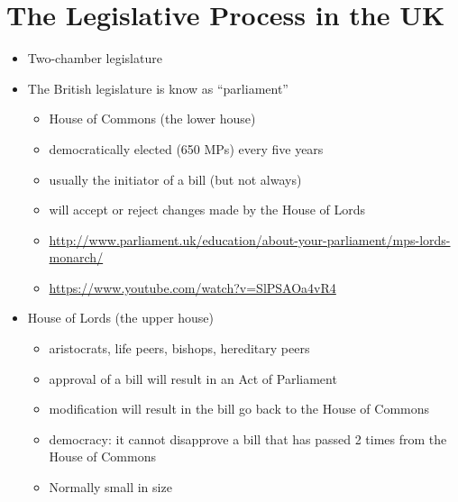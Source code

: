 \documentclass{article}
\begin{document}
\section{The Legislative Process in the UK}
\begin{itemize}
\item Two-chamber legislature
\item The British  legislature is know as ``parliament''
\begin{itemize}
\item House of Commons (the lower house)
\item democratically elected (650 MPs) every five years
\item usually the initiator of a bill (but not always)
\item will accept or reject changes made by the House of Lords
\item \url{http://www.parliament.uk/education/about-your-parliament/mps-lords-monarch/}
\item \url{https://www.youtube.com/watch?v=SlPSAOa4vR4}
\end{itemize}
\item House of Lords (the upper house)
\begin{itemize}
\item aristocrats, life peers, bishops, hereditary peers
\item approval of a bill will result in an Act of Parliament
\item modification will result in the bill go back to the House of Commons
\item democracy: it cannot disapprove a bill that has passed 2 times from the House of Commons
\item Normally small in size
\end{itemize}
\end{itemize}
\end{document}
